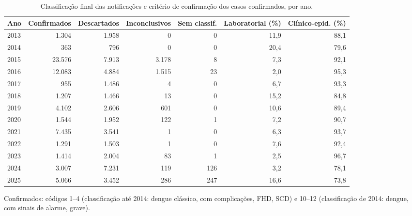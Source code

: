 \begin{table}[htbp]
\centering
\small
\caption{Classificação final das notificações e critério de confirmação dos casos confirmados, por ano.}
\label{tab:classificacao}
\begin{adjustbox}{max width=\linewidth}
\begin{tabular}{lrrrrrr}
\toprule
Ano & Confirmados & Descartados & Inconclusivos & Sem classif. & Laboratorial (\%) & Clínico-epid. (\%) \\
\midrule
2013 & 1.304 & 1.958 & 0 & 0 & 11,9 & 88,1 \\
2014 & 363 & 796 & 0 & 0 & 20,4 & 79,6 \\
2015 & 23.576 & 7.913 & 3.178 & 8 & 7,3 & 92,1 \\
2016 & 12.083 & 4.884 & 1.515 & 23 & 2,0 & 95,3 \\
2017 & 955 & 1.486 & 4 & 0 & 6,7 & 93,3 \\
2018 & 1.207 & 1.466 & 13 & 0 & 15,2 & 84,8 \\
2019 & 4.102 & 2.606 & 601 & 0 & 10,6 & 89,4 \\
2020 & 1.544 & 1.952 & 122 & 1 & 7,2 & 90,7 \\
2021 & 7.435 & 3.541 & 1 & 0 & 6,3 & 93,7 \\
2022 & 1.291 & 1.503 & 1 & 0 & 7,6 & 92,4 \\
2023 & 1.414 & 2.004 & 83 & 1 & 2,5 & 96,7 \\
2024 & 3.007 & 7.231 & 119 & 126 & 3,2 & 78,1 \\
2025 & 5.066 & 3.452 & 286 & 247 & 16,6 & 73,8 \\
\bottomrule
\end{tabular}
\end{adjustbox}
\par\smallskip\begin{minipage}{0.95\linewidth}\footnotesize Confirmados: códigos 1--4 (classificação até 2014: dengue clássico, com complicações, FHD, SCD) e 10--12 (classificação de 2014: dengue, com sinais de alarme, grave).\end{minipage}
\end{table}
